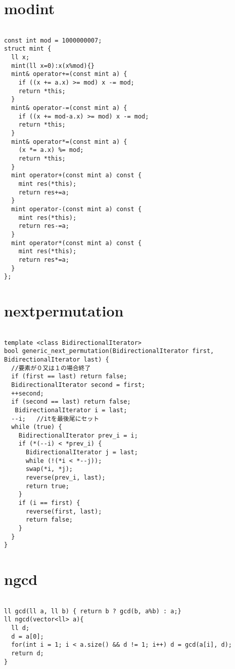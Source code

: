 \documentclass[a4j,titlepage]{jarticle} %
\begin{document}
\color{white}
\section{modint}
\color{black}
\begin{lstlisting}[caption=modint]

const int mod = 1000000007;
struct mint {
  ll x;
  mint(ll x=0):x(x%mod){}
  mint& operator+=(const mint a) {
    if ((x += a.x) >= mod) x -= mod;
    return *this;
  }
  mint& operator-=(const mint a) {
    if ((x += mod-a.x) >= mod) x -= mod;
    return *this;
  }
  mint& operator*=(const mint a) {
    (x *= a.x) %= mod;
    return *this;
  }
  mint operator+(const mint a) const {
    mint res(*this);
    return res+=a;
  }
  mint operator-(const mint a) const {
    mint res(*this);
    return res-=a;
  }
  mint operator*(const mint a) const {
    mint res(*this);
    return res*=a;
  }
};

\end{lstlisting}

\color{white}
\section{nextpermutation}
\color{black}
\begin{lstlisting}[caption=nextpermutation]

template <class BidirectionalIterator>
bool generic_next_permutation(BidirectionalIterator first, BidirectionalIterator last) {
  //要素が０又は１の場合終了
  if (first == last) return false;
  BidirectionalIterator second = first;
  ++second;
  if (second == last) return false;
   BidirectionalIterator i = last;
  --i;   //itを最後尾にセット
  while (true) {
    BidirectionalIterator prev_i = i;
    if (*(--i) < *prev_i) {
      BidirectionalIterator j = last;
      while (!(*i < *--j));
      swap(*i, *j);
      reverse(prev_i, last);
      return true;
    }
    if (i == first) {
      reverse(first, last);
      return false;
    }
  }
}

\end{lstlisting}

\color{white}
\section{ngcd}
\color{black}
\begin{lstlisting}[caption=ngcd]

ll gcd(ll a, ll b) { return b ? gcd(b, a%b) : a;}
ll ngcd(vector<ll> a){
  ll d;
  d = a[0];
  for(int i = 1; i < a.size() && d != 1; i++) d = gcd(a[i], d);
  return d;
}

\end{lstlisting}
\end{document}

